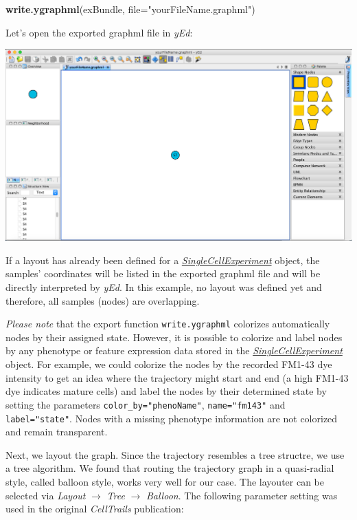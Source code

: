 \documentclass[]{book}
\newenvironment{Shaded}{\begin{snugshade}}{\end{snugshade}}
\newcommand{\KeywordTok}[1]{\textcolor[rgb]{0.13,0.29,0.53}{\textbf{#1}}}
\newcommand{\DataTypeTok}[1]{\textcolor[rgb]{0.13,0.29,0.53}{#1}}
\newcommand{\StringTok}[1]{\textcolor[rgb]{0.31,0.60,0.02}{#1}}
\newcommand{\NormalTok}[1]{#1}
\theoremstyle{definition}
\theoremstyle{definition}
\theoremstyle{definition}
\theoremstyle{remark}
\begin{document}
\begin{Shaded}
\begin{Highlighting}[]
\KeywordTok{write.ygraphml}\NormalTok{(exBundle, }\DataTypeTok{file=}\StringTok{"yourFileName.graphml"}\NormalTok{)}
\end{Highlighting}
\end{Shaded}

Let's open the exported graphml file in \emph{yEd}:

\includegraphics[width=35.56in]{img/yEd_1}

If a layout has already been defined for a
\emph{\href{http://bioconductor.org/packages/SingleCellExperiment}{SingleCellExperiment}}
object, the samples' coordinates will be listed in the exported graphml
file and will be directly interpreted by \emph{yEd}. In this example, no
layout was defined yet and therefore, all samples (nodes) are
overlapping.

\emph{Please note} that the export function \texttt{write.ygraphml}
colorizes automatically nodes by their assigned state. However, it is
possible to colorize and label nodes by any phenotype or feature
expression data stored in the
\emph{\href{http://bioconductor.org/packages/SingleCellExperiment}{SingleCellExperiment}}
object. For example, we could colorize the nodes by the recorded FM1-43
dye intensity to get an idea where the trajectory might start and end (a
high FM1-43 dye indicates mature cells) and label the nodes by their
determined state by setting the parameters
\texttt{color\_by="phenoName"}, \texttt{name="fm143"} and
\texttt{label="state"}. Nodes with a missing phenotype information are
not colorized and remain transparent.

Next, we layout the graph. Since the trajectory resembles a tree
structre, we use a tree algorithm. We found that routing the trajectory
graph in a quasi-radial style, called balloon style, works very well for
our case. The layouter can be selected via \emph{Layout} \(\rightarrow\)
\emph{Tree} \(\rightarrow\) \emph{Balloon}. The following parameter
setting was used in the original \emph{CellTrails} publication:
\end{document}
